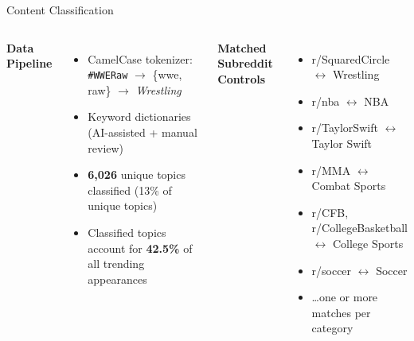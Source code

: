 \documentclass[aspectratio=169,t]{beamer}
\newcommand{\orange}[1]{\textcolor{uteporange}{\textbf{#1}}}
\newcommand{\blue}[1]{\textcolor{utepblue}{\textbf{#1}}}
\begin{document}
\begin{frame}{Content Classification}
\begin{columns}[T]
    \blue{Data Pipeline}
    \begin{itemize}\setlength\itemsep{0.35em}\small
      \item CamelCase tokenizer:\\
            \texttt{\#WWERaw} $\to$ \{wwe, raw\} $\to$ \textit{Wrestling}
      \item Keyword dictionaries (AI-assisted + manual review)
      \item \orange{6,026} unique topics classified (13\% of unique topics)
      \item Classified topics account for \orange{42.5\%} of all trending appearances
            
    \end{itemize}

    \blue{Matched Subreddit Controls}
    \begin{itemize}\setlength\itemsep{0.35em}\small
      \item r/SquaredCircle $\leftrightarrow$ Wrestling
      \item r/nba $\leftrightarrow$ NBA
      \item r/TaylorSwift $\leftrightarrow$ Taylor Swift
      \item r/MMA $\leftrightarrow$ Combat Sports
      \item r/CFB, r/CollegeBasketball $\leftrightarrow$ College Sports
      \item r/soccer $\leftrightarrow$ Soccer
      \item \ldots one or more matches per category
    \end{itemize}
\end{columns}
\end{frame}
\end{document}
